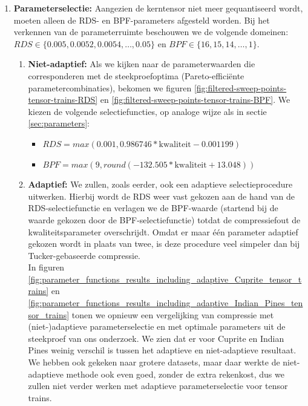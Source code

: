 \begin{enumerate}
\item \textbf{Parameterselectie:} Aangezien de kerntensor niet meer gequantiseerd wordt, moeten alleen de RDS- en BPF-parameters afgesteld worden. Bij het verkennen van de parameterruimte beschouwen we de volgende domeinen: $RDS \in \{0.005, 0.0052, 0.0054, \dots, 0.05\}$ en $BPF \in \{16, 15, 14, \dots, 1\}$.
\begin{enumerate}

\item \textbf{Niet-adaptief:} Als we kijken naar de parameterwaarden die corresponderen met de steekproefoptima (Pareto-effici\"ente parametercombinaties), bekomen we figuren \ref{fig:filtered-sweep-points-tensor-trains-RDS} en \ref{fig:filtered-sweep-points-tensor-trains-BPF}. We kiezen de volgende selectiefuncties, op analoge wijze als in sectie \ref{sec:parameters}:
\begin{itemize}
\item $RDS = max(0.001, 0.986746*\text{kwaliteit} - 0.001199)$
\item $BPF = max(9, round(-132.505*\text{kwaliteit} + 13.048))$
\end{itemize}

\item \textbf{Adaptief:} We zullen, zoals eerder, ook een adaptieve selectieprocedure uitwerken. Hierbij wordt de RDS weer vast gekozen aan de hand van de RDS-selectiefunctie en verlagen we de BPF-waarde (startend bij de waarde gekozen door de BPF-selectiefunctie) totdat de compressiefout de kwaliteitsparameter overschrijdt. Omdat er maar \'e\'en parameter adaptief gekozen wordt in plaats van twee, is deze procedure veel simpeler dan bij Tucker-gebaseerde compressie.\\

In figuren \ref{fig:parameter_functions_results_including_adaptive_Cuprite_tensor_trains} en \ref{fig:parameter_functions_results_including_adaptive_Indian_Pines_tensor_trains} tonen we opnieuw een vergelijking van compressie met (niet-)adaptieve parameterselectie en met optimale parameters uit de steekproef van ons onderzoek. We zien dat er voor Cuprite en Indian Pines weinig verschil is tussen het adaptieve en niet-adaptieve resultaat. We hebben ook gekeken naar grotere datasets, maar daar werkte de niet-adaptieve methode ook even goed, zonder de extra rekenkost, dus we zullen niet verder werken met adaptieve parameterselectie voor tensor trains.

\end{enumerate}
\end{enumerate}

